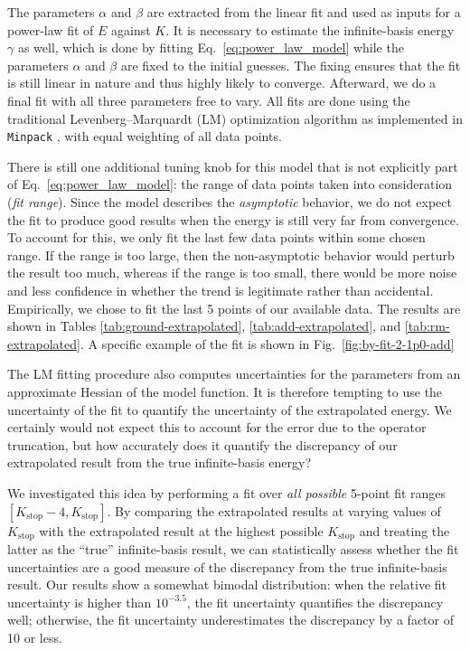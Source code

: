 \documentclass[aip, jcp, 12pt]{revtex4-1}
\begin{document}
The parameters $\alpha$ and $\beta$ are extracted from the linear fit and used as inputs for a power-law fit of $E$ against $K$.  It is necessary to estimate the infinite-basis energy $\gamma$ as well, which is done by fitting Eq.\ \eqref{eq:power_law_model} while the parameters $\alpha$ and $\beta$ are fixed to the initial guesses.  The fixing ensures that the fit is still linear in nature and thus highly likely to converge.  Afterward, we do a final fit with all three parameters free to vary.  All fits are done using the traditional Levenberg--Marquardt (LM) optimization algorithm \cite{10.2307/43633451,doi:10.1137/0111030} as implemented in \texttt{Minpack} \cite{More1978,More:126569}, with equal weighting of all data points.

There is still one additional tuning knob for this model that is not explicitly part of Eq.\ \eqref{eq:power_law_model}: the range of data points taken into consideration (\textit{fit range}).  Since the model describes the \emph{asymptotic} behavior, we do not expect the fit to produce good results when the energy is still very far from convergence.  To account for this, we only fit the last few data points within some chosen range.  If the range is too large, then the non-asymptotic behavior would perturb the result too much, whereas if the range is too small, there would be more noise and less confidence in whether the trend is legitimate rather than accidental.  Empirically, we chose to fit the last 5 points of our available data.  The results are shown in Tables \ref{tab:ground-extrapolated}, \ref{tab:add-extrapolated}, and \ref{tab:rm-extrapolated}.  A specific example of the fit is shown in Fig.\ \ref{fig:by-fit-2-1p0-add}

The LM fitting procedure also computes uncertainties for the parameters from an approximate Hessian of the model function.  It is therefore tempting to use the uncertainty of the fit to quantify the uncertainty of the extrapolated energy.  We certainly would not expect this to account for the error due to the operator truncation, but how accurately does it quantify the discrepancy of our extrapolated result from the true infinite-basis energy?

We investigated this idea by performing a fit over \emph{all possible} 5-point fit ranges $[K_{\text{stop}} - 4, K_{\text{stop}}]$.  By comparing the extrapolated results at varying values of $K_{\text{stop}}$ with the extrapolated result at the highest possible $K_{\text{stop}}$ and treating the latter as the ``true'' infinite-basis result, we can statistically assess whether the fit uncertainties are a good measure of the discrepancy from the true infinite-basis result.  Our results show a somewhat bimodal distribution: when the relative fit uncertainty is higher than $10^{-3.5}$, the fit uncertainty quantifies the discrepancy well; otherwise, the fit uncertainty underestimates the discrepancy by a factor of 10 or less.
\end{document}
